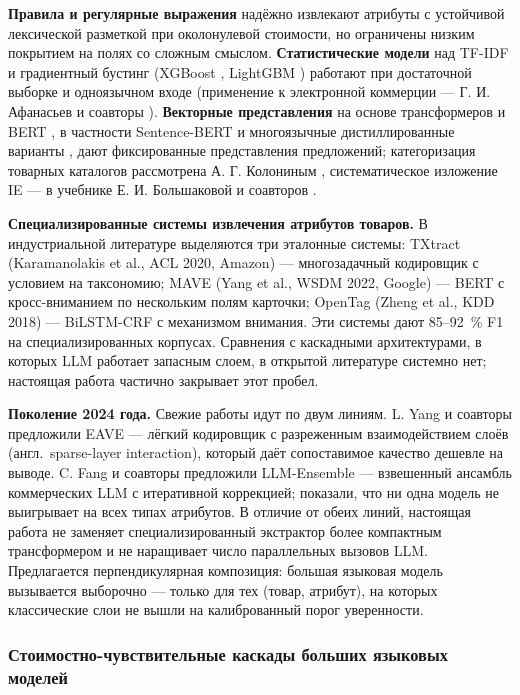 \textbf{Правила и регулярные выражения} надёжно извлекают атрибуты с устойчивой лексической разметкой при околонулевой стоимости, но ограничены низким покрытием на полях со сложным смыслом. \textbf{Статистические модели} над TF-IDF и градиентный бустинг (XGBoost \cite{ref_14}, LightGBM \cite{ref_15}) работают при достаточной выборке и одноязычном входе (применение к электронной коммерции — Г. И. Афанасьев и соавторы \cite{ref_16}). \textbf{Векторные представления} на основе трансформеров \cite{ref_17} и BERT \cite{ref_18}, в частности Sentence-BERT \cite{ref_19} и многоязычные дистиллированные варианты \cite{ref_20}, дают фиксированные представления предложений; категоризация товарных каталогов рассмотрена А. Г. Колониным \cite{ref_21}, систематическое изложение IE — в учебнике Е. И. Большаковой и соавторов \cite{ref_22}.

\textbf{Специализированные системы извлечения атрибутов товаров.} В индустриальной литературе выделяются три эталонные системы: TXtract \cite{ref_23} (Karamanolakis et al., ACL 2020, Amazon) — многозадачный кодировщик с условием на таксономию; MAVE \cite{ref_24} (Yang et al., WSDM 2022, Google) — BERT с кросс-вниманием по нескольким полям карточки; OpenTag \cite{ref_25} (Zheng et al., KDD 2018) — BiLSTM-CRF с механизмом внимания. Эти системы дают 85--92~\% F1 на специализированных корпусах. Сравнения с каскадными архитектурами, в которых LLM работает запасным слоем, в открытой литературе системно нет; настоящая работа частично закрывает этот пробел.

\textbf{Поколение 2024 года.} Свежие работы идут по двум линиям. L. Yang и соавторы предложили EAVE \cite{ref_57} — лёгкий кодировщик с разреженным взаимодействием слоёв (англ.\ sparse-layer interaction), который даёт сопоставимое качество дешевле на выводе. C. Fang и соавторы предложили LLM-Ensemble \cite{ref_58} — взвешенный ансамбль коммерческих LLM с итеративной коррекцией; показали, что ни одна модель не выигрывает на всех типах атрибутов. В отличие от обеих линий, настоящая работа не заменяет специализированный экстрактор более компактным трансформером и не наращивает число параллельных вызовов LLM. Предлагается перпендикулярная композиция: большая языковая модель вызывается выборочно — только для тех (товар, атрибут), на которых классические слои не вышли на калиброванный порог уверенности.

\subsubsection{Стоимостно-чувствительные каскады больших языковых моделей}

